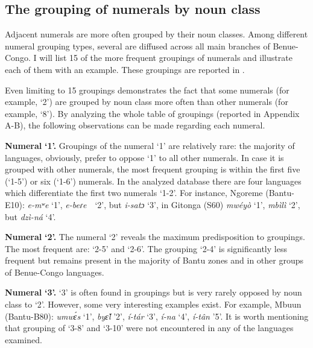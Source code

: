 \subsection{The grouping of numerals by noun class} %
Adjacent numerals are more often grouped by their noun classes. Among different numeral grouping types, several are diffused across all main branches of Benue-Congo. I will list 15 of the more frequent groupings of numerals and illustrate each of them with an example. These groupings are reported in . 

Even limiting  to 15 groupings demonstrates the fact that some numerals (for example, `2') are grouped by noun class more often than other numerals (for example, `8'). By analyzing the whole table of groupings (reported in Appendix A-B), the following observations can be made regarding each numeral. 

\textbf{Numeral} \textbf{`1'.} Groupings of the numeral `1' are relatively rare: the majority of languages, obviously, prefer to oppose ‘1’ to all other numerals. In case it is grouped with other numerals, the most frequent grouping is within the first five (‘1-5’) or six (‘1-6’) numerals. In the analyzed database there are four languages which differentiate the first two numerals ‘1-2’. For instance, Ngoreme (Bantu-E10): \textit{e-mʷe} ‘1’, \textit{e-beɾe}~~‘2’, but \textit{i-satɔ} ‘3’, in Gitonga (S60) \textit{mw{\'{e}}y{\`{o}}} ‘1’, \textit{mbìlì} ‘2’, but \textit{dzì-n{\'{a}}} ‘4’. 

\textbf{Numeral} \textbf{`2'.} The numeral `2' reveals the maximum predisposition to groupings. The most frequent are: ‘2-5’ and ‘2-6’. The grouping ‘2-4’ is significantly less frequent but remains present in the majority of Bantu zones and in other groups of Benue-Congo languages. 

\textbf{Numeral} \textbf{`3'.} `3' is often found in groupings but is very rarely opposed by noun class to `2'. However, some very interesting examples exist. For example, Mbuun (Bantu-B80): \textit{umw{\'{ɛ}}s} ‘1’, \textit{by{\v{ɛ}}l} ’2’, \textit{{\'{i}}-t{\'{a}}r} ‘3’, \textit{{\'{i}}-na} ‘4’, \textit{{\'{i}}-t{\^{a}}n} ’5’. It is worth mentioning that grouping of ‘3-8’ and ‘3-10’ were not encountered in any of the languages examined. 

